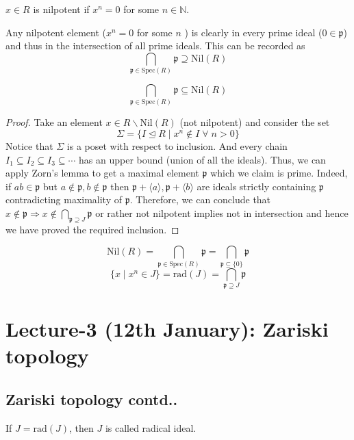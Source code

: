 \documentclass[oneside, 12pt, ]{scrbook}
\newcommand{\NN}{\mathbb N}
\newcommand{\spec}{\mathrm{Spec}}
\newcommand{\pr}{\mathfrak{p}}
\newcommand{\nil}{\mathrm{Nil}}
\theoremstyle{theorem}
\begin{document}
\begin{definition}
$x\in R$ is nilpotent if $x^n =0$ for some $n \in \NN$.
\end{definition}

\begin{remark}
Any nilpotent element ($x^n = 0$ for some $n$ ) is clearly in every prime ideal ($0 \in \mathfrak{p}$) and thus in the intersection of all prime ideals. This can be recorded as $$\bigcap_{\pr \in \spec(R)} \pr \supseteq \nil(R)$$
\end{remark}

\begin{proposition}
$$\bigcap_{\pr \in \spec(R)} \pr \subseteq \nil(R)$$
\end{proposition}

\begin{proof}
Take an element $x \in R \backslash \nil(R)$ (not nilpotent) and consider the set $$\Sigma = \{ I \unlhd R \mid x^n \not \in I \; \forall \; n >0\}$$
Notice that $\Sigma$ is a poset with respect to inclusion. And every chain $I_{1} \subseteq I_{2} \subseteq I_{3} \subseteq \cdots $ has an upper bound (union of all the ideals). Thus, we can apply Zorn's lemma to get a maximal element $\pr$ which we claim is prime. Indeed, if $ab \in \pr$ but $a\not \in \pr, b \not \in \pr$ then $\pr + \langle a \rangle, \pr + \langle b \rangle$ are ideals strictly containing $\pr$ contradicting maximality of $\pr$. Therefore, we can conclude that $x \not \in \pr \Rightarrow x \not \in \bigcap_{\pr \supseteq J} \pr$ or rather not nilpotent implies not in intersection and hence we have proved the required inclusion. 
\end{proof}

$$\nil (R) = \bigcap_{\pr \in \spec (R)} \pr = \bigcap_{\pr \subseteq \{0\}} \pr$$
$$\{x \mid x^n \in J\} = \mathrm{rad}(J) = \bigcap_{\pr \supseteq J} \pr $$

\chapter{Lecture-3 (12th January): Zariski topology }

\section{Zariski topology contd..}

\begin{definition}
If $J = \mathrm{rad}(J)$, then $J$ is called radical ideal.
\end{definition}
\end{document}
